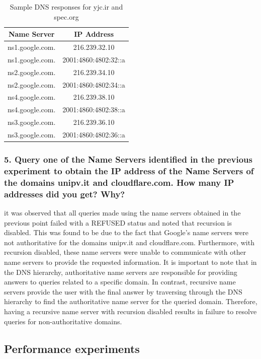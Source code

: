 \documentclass[eng]{class}
\begin{document}
\begin{table}[H]
  \centering
  \footnotesize
  \begin{tabular}{cc}
    \linewidth=0cm
    Name Server     & IP Address           \\
    \hline
    ns1.google.com. & 216.239.32.10        \\
    ns1.google.com. & 2001:4860:4802:32::a \\
    ns2.google.com. & 216.239.34.10        \\
    ns2.google.com. & 2001:4860:4802:34::a \\
    ns4.google.com. & 216.239.38.10        \\
    ns4.google.com. & 2001:4860:4802:38::a \\
    ns3.google.com. & 216.239.36.10        \\
    ns3.google.com. & 2001:4860:4802:36::a \\
  \end{tabular}
  \caption{Sample DNS responses for yjc.ir and spec.org}
  \label{tab-5}
\end{table}
\subsubsection*{5. Query one of the Name Servers identified in the previous experiment to obtain the
  IP address of the Name Servers of the domains unipv.it and
  cloudflare.com. How many IP addresses did you get? Why?}
it was observed that all queries made using the name servers obtained in the previous point failed with a REFUSED status and noted that recursion is disabled.
This was found to be due to the fact that Google's name servers were not authoritative for the domains unipv.it and cloudflare.com.
Furthermore, with recursion disabled, these name servers were unable to communicate with other name servers to provide the requested information.
It is important to note that in the DNS hierarchy, authoritative name servers are responsible for providing answers to queries related to a specific domain.
In contrast, recursive name servers provide the user with the final answer by traversing through the DNS hierarchy to find the authoritative name server for the queried domain.
Therefore, having a recursive name server with recursion disabled results in failure to resolve queries for non-authoritative domains.
\subsection{Performance experiments}
\end{document}
